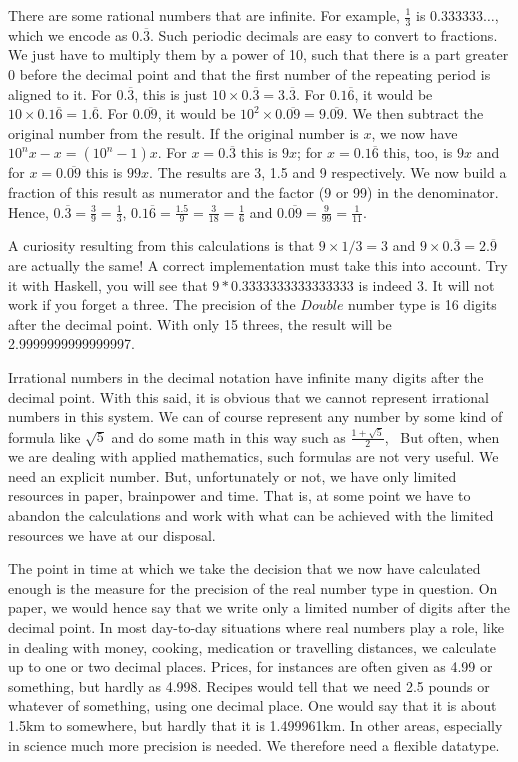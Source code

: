 \documentclass[tikz]{scrreprt}
\newcommand{\Conid}[1]{\mathit{#1}}
\begin{document}
There are some rational numbers that are infinite.
For example, $\frac{1}{3}$ is $0.333333\dots$,
which we encode as $0.\overline{3}$.
Such periodic decimals are easy to convert
to fractions. We just have to multiply them
by a power of 10, such that there is a part
greater 0 before the decimal point and
that the first number
of the repeating period is aligned to it.
For $0.\overline{3}$, 
this is just $10\times 0.\overline{3} = 3.\overline{3}$.
For $0.1\overline{6}$,
it would be $10\times 0.1\overline{6} = 1.\overline{6}$.
For $0.\overline{09}$,
it would be $10^2\times 0.\overline{09} = 9.\overline{09}$.
We then subtract the original number from the result.
If the original number is $x$, we now have 
$10^nx - x = (10^n-1)x$.
For $x=0.\overline{3}$ this is $9x$;
for $x=0.1\overline{6}$ this, too, is $9x$ and
for $x=0.\overline{09}$ this is $99x$.
The results are 3, 1.5 and 9 respectively.
We now build a fraction of this result as numerator
and the factor (9 or 99) in the denominator.
Hence, $0.\overline{3} = \frac{3}{9} = \frac{1}{3}$,
$0.1\overline{6} = \frac{1.5}{9} = \frac{3}{18} = \frac{1}{6}$ and
$0.\overline{09} = \frac{9}{99} = \frac{1}{11}$.

A curiosity resulting from this calculations
is that $9\times 1/3 = 3$ and 
$9 \times 0.\overline{3} = 2.\overline{9}$
are actually the same! A correct implementation
must take this into account.
Try it with Haskell, you will see that
\ensuremath{\mathrm{9}\mathbin{*}\mathrm{0.3333333333333333}} is indeed 3.
It will not work if you forget a three.
The precision of the \ensuremath{\Conid{Double}} number type is 16
digits after the decimal point. With only 15 threes,
the result will be 2.9999999999999997.

Irrational numbers in the decimal notation
have infinite many digits after the decimal point.
With this said, it is obvious that we cannot
represent irrational numbers in this system.
We can of course represent any number by some
kind of formula like $\sqrt{5}$ and do some
math in this way such as $\frac{1+\sqrt{5}}{2}$,
\etc\ But often, when we are dealing with
applied mathematics, such formulas are not
very useful. We need an explicit number.
But, unfortunately or not, we have only
limited resources in paper, brainpower and
time. That is, at some point we have to 
abandon the calculations and work with what
can be achieved with the limited resources
we have at our disposal.

The point in time at which we take
the decision that we now have calculated
enough is the measure for the precision
of the real number type in question.
On paper, we would hence say that we
write only a limited number of digits
after the decimal point. In most day-to-day
situations where real numbers play a role,
like in dealing with money, cooking,
medication or travelling distances,
we calculate up to one or two decimal places.
Prices, for instances are often given 
as 4.99 or something, but hardly as 4.998.
Recipes would tell that we need 2.5 pounds
or whatever of something, using one decimal place.
One would say that it is about 1.5km 
to somewhere, but hardly that it is 1.499961km.
In other areas, especially in science 
much more precision is needed.
We therefore need a flexible datatype.
\end{document}

